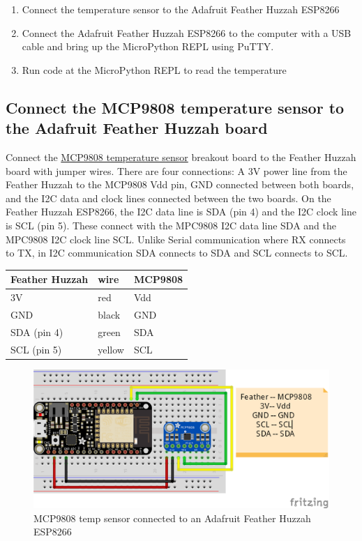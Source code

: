 \documentclass{book}
\makeatletter
\def\maxwidth{\ifdim\Gin@nat@width>\linewidth\linewidth
    \else\Gin@nat@width\fi}
\let\Oldincludegraphics\includegraphics
\renewcommand{\includegraphics}[1]{\Oldincludegraphics[width=.8\maxwidth]{#1}}
\providecommand{\tightlist}{%
      \setlength{\itemsep}{0pt}\setlength{\parskip}{0pt}}
\makeatother
\begin{document}
    
        \begin{enumerate}
\def\labelenumi{\arabic{enumi}.}
\tightlist
\item
  Connect the temperature sensor to the Adafruit Feather Huzzah ESP8266
\item
  Connect the Adafruit Feather Huzzah ESP8266 to the computer with a USB
  cable and bring up the MicroPython REPL using PuTTY.
\item
  Run code at the MicroPython REPL to read the temperature
\end{enumerate}
    




    
        \subsection{Connect the MCP9808 temperature sensor to the Adafruit
Feather Huzzah
board}\label{connect-the-mcp9808-temperature-sensor-to-the-adafruit-feather-huzzah-board}
    




    
        Connect the \href{https://www.adafruit.com/product/1782}{MCP9808
temperature sensor} breakout board to the Feather Huzzah board with
jumper wires. There are four connections: A 3V power line from the
Feather Huzzah to the MCP9808 Vdd pin, GND connected between both
boards, and the I2C data and clock lines connected between the two
boards. On the Feather Huzzah ESP8266, the I2C data line is SDA (pin 4)
and the I2C clock line is SCL (pin 5). These connect with the MPC9808
I2C data line SDA and the MPC9808 I2C clock line SCL. Unlike Serial
communication where RX connects to TX, in I2C communication SDA connects
to SDA and SCL connects to SCL.

\begin{longtable}[]{@{}lll@{}}
\toprule
Feather Huzzah & wire & MCP9808\tabularnewline
\midrule
\endhead
3V & red & Vdd\tabularnewline
GND & black & GND\tabularnewline
SDA (pin 4) & green & SDA\tabularnewline
SCL (pin 5) & yellow & SCL\tabularnewline
\bottomrule
\end{longtable}

\begin{figure}
\centering
\includegraphics{images/feather_huzzah_temp_sensor_fritzing.png}
\caption{MCP9808 temp sensor connected to an Adafruit Feather Huzzah
ESP8266}
\end{figure}
    
\end{document}
